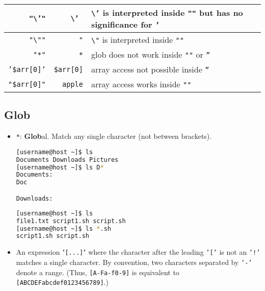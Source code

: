 \documentclass{article}
\newcommand{\inlinecode}[1]{\colorbox{backcolour}{\footnotesize{\texttt{#1}}}}
\begin{document}
\begin{itemize}
{\begin{tabularx}{\linewidth}{ | r | r |>{\raggedright\arraybackslash}X|}
			      \inlinecode{"\textbackslash'"} & \inlinecode{\textbackslash'  } & \inlinecode{\textbackslash'} is interpreted inside \inlinecode{""} but has no significance for \inlinecode{'}                     \\\hline
			      \inlinecode{"\textbackslash""} & \inlinecode{"}                 & \inlinecode{\textbackslash"} is interpreted inside \inlinecode{""}                                                                \\\hline
			      \inlinecode{"*"}               & \inlinecode{*}                 & glob does not work inside \inlinecode{""} or \inlinecode{''}                                                                      \\\hline
			      \inlinecode{'\${arr[0]}'}      & \inlinecode{\${arr[0]}}        & array access not possible inside \inlinecode{''}                                                                                  \\\hline
			      \inlinecode{"\${arr[0]}"}      & \inlinecode{apple}             & array access works inside \inlinecode{""}                                                                                         \\\hline
		      \end{tabularx}}

\end{itemize}

\subsection{Glob}
\begin{itemize}
	\item \inlinecode{*}: \textbf{Glob}al. Match any single character (not between brackets).
	      \begin{lstlisting}[style=terminal, language=bash]
[username@host ~]$ ls
Documents Downloads Pictures
[username@host ~]$ ls D*
Documents:
Doc

Downloads:
    \end{lstlisting}
	      \begin{lstlisting}[style=terminal, language=bash]
[username@host ~]$ ls
file1.txt script1.sh script.sh
[username@host ~]$ ls *.sh
script1.sh script.sh
\end{lstlisting}

	\item An expression "\inlinecode{[...]}" where the character after the leading \inlinecode{'['} is not an \inlinecode{'!'} matches a single character. By convention, two characters separated by \inlinecode{'-'} denote a range. (Thus, \inlinecode{[A-Fa-f0-9]} is equivalent to \inlinecode{[ABCDEFabcdef0123456789]}.)

\end{itemize}
\end{document}
